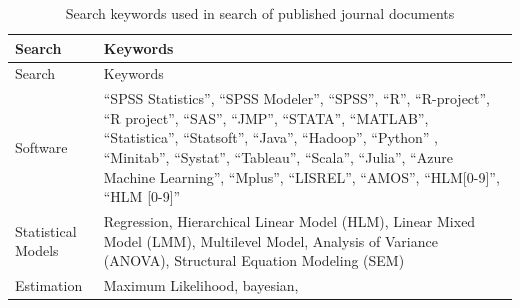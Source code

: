 \documentclass[english,floatsintext,man]{apa6}
\theoremstyle{definition}
\theoremstyle{definition}
\theoremstyle{remark}
\begin{document}
\begin{longtable}[]{@{}ll@{}}
\caption{\label{tab:searchwords} Search keywords used in search of published
journal documents}\tabularnewline
\toprule
\begin{minipage}[b]{0.21\columnwidth}\raggedright\strut
Search\strut
\end{minipage} & \begin{minipage}[b]{0.38\columnwidth}\raggedright\strut
Keywords\strut
\end{minipage}\tabularnewline
\midrule
\endfirsthead
\toprule
\begin{minipage}[b]{0.21\columnwidth}\raggedright\strut
Search\strut
\end{minipage} & \begin{minipage}[b]{0.38\columnwidth}\raggedright\strut
Keywords\strut
\end{minipage}\tabularnewline
\midrule
\endhead
\begin{minipage}[t]{0.21\columnwidth}\raggedright\strut
Software\strut
\end{minipage} & \begin{minipage}[t]{0.38\columnwidth}\raggedright\strut
\enquote{SPSS Statistics}, \enquote{SPSS Modeler}, \enquote{SPSS},
\enquote{R}, \enquote{R-project}, \enquote{R project}, \enquote{SAS},
\enquote{JMP}, \enquote{STATA}, \enquote{MATLAB}, \enquote{Statistica},
\enquote{Statsoft}, \enquote{Java}, \enquote{Hadoop}, \enquote{Python} ,
\enquote{Minitab}, \enquote{Systat}, \enquote{Tableau}, \enquote{Scala},
\enquote{Julia}, \enquote{Azure Machine Learning}, \enquote{Mplus},
\enquote{LISREL}, \enquote{AMOS}, \enquote{HLM{[}0-9{]}}, \enquote{HLM
{[}0-9{]}}\strut
\end{minipage}\tabularnewline
\begin{minipage}[t]{0.21\columnwidth}\raggedright\strut
Statistical Models\strut
\end{minipage} & \begin{minipage}[t]{0.38\columnwidth}\raggedright\strut
Regression, Hierarchical Linear Model (HLM), Linear Mixed Model (LMM),
Multilevel Model, Analysis of Variance (ANOVA), Structural Equation
Modeling (SEM)\strut
\end{minipage}\tabularnewline
\begin{minipage}[t]{0.21\columnwidth}\raggedright\strut
Estimation\strut
\end{minipage} & \begin{minipage}[t]{0.38\columnwidth}\raggedright\strut
Maximum Likelihood, bayesian,\strut
\end{minipage}\tabularnewline
\bottomrule
\end{longtable}
\end{document}
